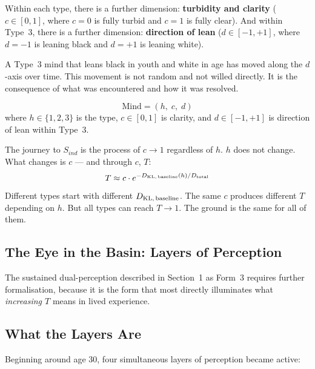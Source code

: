 \documentclass[12pt, a4paper]{article}
\begin{document}
Within each type, there is a further dimension: \textbf{turbidity and clarity}
($c \in [0,1]$, where $c = 0$ is fully turbid and $c = 1$ is fully clear).
And within Type~3, there is a further dimension: \textbf{direction of lean}
($d \in [-1, +1]$, where $d = -1$ is leaning black and $d = +1$ is leaning white).

A Type~3 mind that leans black in youth and white in age has moved along
the $d$-axis over time. This movement is not random and not willed directly.
It is the consequence of what was encountered and how it was resolved.

\begin{keybox}[title={The Full Coordinate of a Mind in $S_{dep}$}]
\[
  \text{Mind} = (h,\; c,\; d)
\]
where $h \in \{1, 2, 3\}$ is the type, $c \in [0,1]$ is clarity,
and $d \in [-1, +1]$ is direction of lean within Type~3.

The journey to $S_{ind}$ is the process of $c \to 1$ regardless of $h$.
$h$ does not change. What changes is $c$ --- and through $c$, $T$:
\[
  T \approx c \cdot e^{-D_{\rm KL,\,baseline}(h)/D_{\rm total}}
\]
Different types start with different $D_{\rm KL,\,baseline}$.
The same $c$ produces different $T$ depending on $h$.
But all types can reach $T \to 1$. The ground is the same for all of them.
\end{keybox}

\subsection*{The Eye in the Basin: Layers of Perception}

The sustained dual-perception described in Section~1 as Form~3 requires
further formalisation, because it is the form that most directly illuminates
what \textit{increasing $T$} means in lived experience.

\subsection{What the Layers Are}

Beginning around age 30, four simultaneous layers of perception became active:
\end{document}

